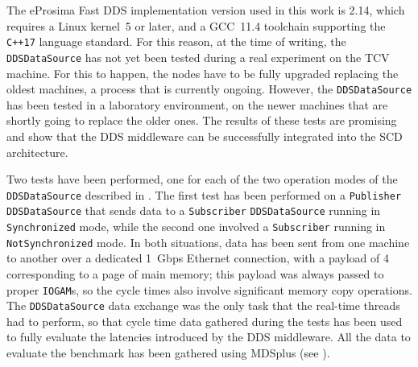 The eProsima Fast DDS implementation version used in this work is 2.14, which requires a Linux kernel~5 or later, and a GCC~11.4 toolchain supporting the \texttt{C++17} language standard. For this reason, at the time of writing, the \texttt{DDSDataSource} has not yet been tested during a real experiment on the TCV machine. For this to happen, the nodes have to be fully upgraded replacing the oldest machines, a process that is currently ongoing. However, the \texttt{DDSDataSource} has been tested in a laboratory environment, on the newer machines that are shortly going to replace the older ones. The results of these tests are promising and show that the DDS middleware can be successfully integrated into the SCD architecture.

Two tests have been performed, one for each of the two operation modes of the \texttt{DDSDataSource} described in . The first test has been performed on a \texttt{Publisher} \texttt{DDSDataSource} that sends data to a \texttt{Subscriber} \texttt{DDSDataSource} running in \texttt{Synchronized} mode, while the second one involved a \texttt{Subscriber} running in \texttt{NotSynchronized} mode. In both situations, data has been sent from one machine to another over a dedicated \SI{1}{Gbps} Ethernet connection, with a payload of \SI{4}{\kilo\byte} corresponding to a page of main memory; this payload was always passed to proper \texttt{IOGAM}s, so the cycle times also involve significant memory copy operations. The \texttt{DDSDataSource} data exchange was the only task that the real-time threads had to perform, so that cycle time data gathered during the tests has been used to fully evaluate the latencies introduced by the DDS middleware. All the data to evaluate the benchmark has been gathered using MDSplus (see ).

